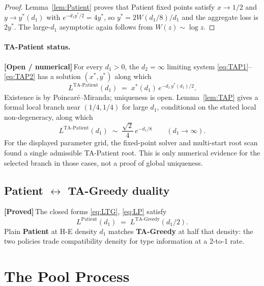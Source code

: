 \documentclass{article}
\theoremstyle{plain}
\theoremstyle{definition}
\newcommand{\proved}{\textcolor{provedgreen}{\textbf{[Proved]}}\,}
\newcommand{\open}{\textcolor{openred}{\textbf{[Open / numerical]}}\,}
\begin{document}
\begin{proof}
Lemma~\ref{lem:Patient} proves that Patient fixed points satisfy $x\to1/2$ and $y\to y^\ast(d_1)$ with $e^{-d_1y^\ast/2}=4y^\ast$, so $y^\ast=2W(d_1/8)/d_1$ and the aggregate loss is $2y^\ast$. The large-$d_1$ asymptotic again follows from $W(z)\sim\log z$.
\end{proof}

\paragraph{TA-Patient status.}
\open For every $d_1>0$, the $d_2=\infty$ limiting system \eqref{eq:TAP1}--\eqref{eq:TAP2} has a solution $(x^\ast,y^\ast)$ along which
\begin{equation}
L^{\text{TA-Patient}}(d_1) \;=\; x^\ast(d_1)\,e^{-d_1\,y^\ast(d_1)/2}.\label{eq:LTP}
\end{equation}
Existence is by Poincar\'e--Miranda; uniqueness is open. Lemma~\ref{lem:TAP} gives a formal local branch near $(1/4,1/4)$ for large $d_1$, conditional on the stated local non-degeneracy, along which
\[
L^{\text{TA-Patient}}(d_1) \;\sim\; \frac{\sqrt{2}}{4}\,e^{-d_1/8}\qquad(d_1\to\infty).
\]
For the displayed parameter grid, the fixed-point solver and multi-start root scan found a single admissible TA-Patient root. This is only numerical evidence for the selected branch in those cases, not a proof of global uniqueness.

\subsection{Patient $\leftrightarrow$ TA-Greedy duality}

\proved The closed forms \eqref{eq:LTG}, \eqref{eq:LP} satisfy
\[
L^{\text{Patient}}(d_1) \;=\; L^{\text{TA-Greedy}}(d_1/2).
\]
Plain \textbf{Patient} at H-E density $d_1$ matches \textbf{TA-Greedy} at half that density: the two policies trade compatibility density for type information at a 2-to-1 rate.

\section{The Pool Process}
\label{sec:markov}
\end{document}
